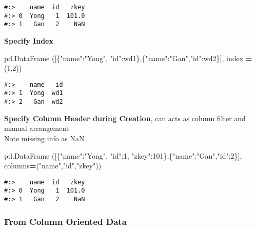 \documentclass[
]{book}
\newenvironment{Shaded}{\begin{snugshade}}{\end{snugshade}}
\newcommand{\DecValTok}[1]{\textcolor[rgb]{0.06,0.06,0.06}{#1}}
\newcommand{\NormalTok}[1]{#1}
\newcommand{\OperatorTok}[1]{\textcolor[rgb]{0.43,0.43,0.43}{\textbf{#1}}}
\newcommand{\StringTok}[1]{\textcolor[rgb]{0.5,0.5,0.5}{#1}}
\begin{document}
\begin{verbatim}
#:>    name  id   zkey
#:> 0  Yong   1  101.0
#:> 1   Gan   2    NaN
\end{verbatim}

\textbf{Specify Index}

\begin{Shaded}
\begin{Highlighting}[]
\NormalTok{pd.DataFrame ([\{}\StringTok{"name"}\NormalTok{:}\StringTok{"Yong"}\NormalTok{, }\StringTok{"id"}\NormalTok{:}\StringTok{\textquotesingle{}wd1\textquotesingle{}}\NormalTok{\},\{}\StringTok{"name"}\NormalTok{:}\StringTok{"Gan"}\NormalTok{,}\StringTok{"id"}\NormalTok{:}\StringTok{\textquotesingle{}wd2\textquotesingle{}}\NormalTok{\}], }
\NormalTok{             index }\OperatorTok{=}\NormalTok{ (}\DecValTok{1}\NormalTok{,}\DecValTok{2}\NormalTok{))}
\end{Highlighting}
\end{Shaded}

\begin{verbatim}
#:>    name   id
#:> 1  Yong  wd1
#:> 2   Gan  wd2
\end{verbatim}

\textbf{Specify Column Header during Creation}, can acts as column filter and manual arrangement\\
Note missing info as NaN

\begin{Shaded}
\begin{Highlighting}[]
\NormalTok{pd.DataFrame ([\{}\StringTok{"name"}\NormalTok{:}\StringTok{"Yong"}\NormalTok{, }\StringTok{"id"}\NormalTok{:}\DecValTok{1}\NormalTok{, }\StringTok{"zkey"}\NormalTok{:}\DecValTok{101}\NormalTok{\},\{}\StringTok{"name"}\NormalTok{:}\StringTok{"Gan"}\NormalTok{,}\StringTok{"id"}\NormalTok{:}\DecValTok{2}\NormalTok{\}], }
\NormalTok{              columns}\OperatorTok{=}\NormalTok{(}\StringTok{"name"}\NormalTok{,}\StringTok{"id"}\NormalTok{,}\StringTok{"zkey"}\NormalTok{))}
\end{Highlighting}
\end{Shaded}

\begin{verbatim}
#:>    name  id   zkey
#:> 0  Yong   1  101.0
#:> 1   Gan   2    NaN
\end{verbatim}

\hypertarget{from-column-oriented-data}{%
\subsubsection{From Column Oriented Data}\label{from-column-oriented-data}}
\end{document}
